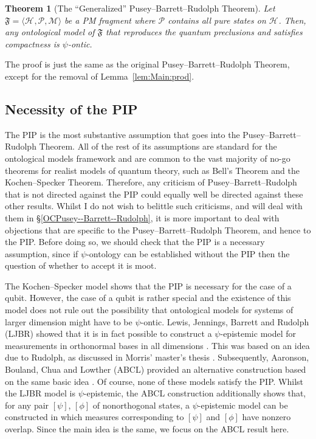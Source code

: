 \documentclass[DIV=calc,paper=a4,fontsize=11pt,twocolumn]{scrartcl} %
\theoremstyle{definition}
\theoremstyle{plain}
\newtheorem{theorem}[definition]{Theorem}
\newcommand{\Proj}[1]{\ensuremath{\left [ #1 \right ]}}
\newcommand{\Hilb}[1][]{\ensuremath{\mathcal{H}_{#1}}}
\begin{document}
\begin{theorem}[The ``Generalized'' Pusey--Barrett--Rudolph Theorem]
\label{thm:Main:Pusey--Barrett--RudolphGen}
Let $\mathfrak{F} = \langle \Hilb, \mathcal{P}, \mathcal{M} \rangle$
be a PM fragment where $\mathcal{P}$ contains all
pure states on $\Hilb$.  Then, any ontological model of
$\mathfrak{F}$ that reproduces the quantum preclusions and satisfies
compactness is $\psi$-ontic.
\end{theorem}

The proof is just the same as the original Pusey--Barrett--Rudolph Theorem, except for the
removal of Lemma~\ref{lem:Main:prod}.

\subsection{Necessity of the PIP}

\label{NPIP}

The PIP is the most substantive assumption that goes into the
Pusey--Barrett--Rudolph Theorem.  All of the rest of its assumptions
are standard for the ontological models framework and are common to
the vast majority of no-go theorems for realist models of quantum
theory, such as Bell's Theorem and the Kochen--Specker Theorem.
Therefore, any criticism of Pusey--Barrett--Rudolph that is not
directed against the PIP could equally well be directed against these
other results.  Whilst I do not wish to belittle such criticisms, and
will deal with them in \S\ref{OCPusey--Barrett--Rudolph}, it is more
important to deal with objections that are specific to the
Pusey--Barrett--Rudolph Theorem, and hence to the PIP\@.  Before doing
so, we should check that the PIP is a necessary assumption, since if
$\psi$-ontology can be established without the PIP then the question
of whether to accept it is moot.

The Kochen--Specker model shows that the PIP is necessary for the case
of a qubit.  However, the case of a qubit is rather special and the
existence of this model does not rule out the possibility that
ontological models for systems of larger dimension might have to be
$\psi$-ontic.  Lewis, Jennings, Barrett and Rudolph (LJBR) showed that
it is in fact possible to construct a $\psi$-epistemic model for
measurements in orthonormal bases in all dimensions \cite{Lewis2012}.
This was based on an idea due to Rudolph, as discussed in Morris'
master's thesis \cite{Morris2009}.  Subsequently, Aaronson, Bouland,
Chua and Lowther (ABCL) provided an alternative construction based on
the same basic idea \cite{Aaronson2013}.  Of course, none of these
models satisfy the PIP\@.  Whilst the LJBR model is $\psi$-epistemic,
the ABCL construction additionally shows that, for any pair
$\Proj{\psi}$, $\Proj{\phi}$ of nonorthogonal states, a
$\psi$-epistemic model can be constructed in which measures
corresponding to $\Proj{\psi}$ and $\Proj{\phi}$ have nonzero overlap.
Since the main idea is the same, we focus on the ABCL result here.
\end{document}
